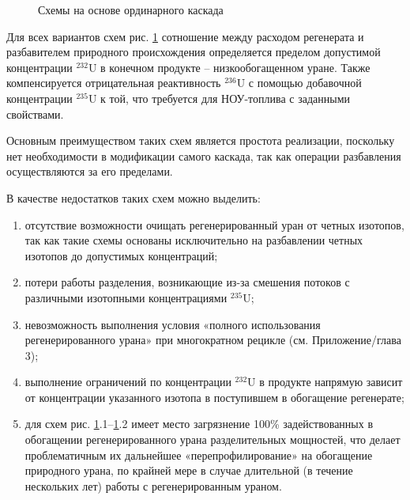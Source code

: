 \begin{figure}[ht]
  \caption{Схемы на основе ординарного каскада}\label{fig:diagram1}
\end{figure}

Для всех вариантов схем рис. \ref{fig:diagram1} сотношение между расходом регенерата и разбавителем природного происхождения определяется пределом допустимой концентрации $^{232}$U в конечном продукте -- низкообогащенном уране. Также компенсируется отрицательная реактивность $^{236}$U с помощью добавочной концентрации $^{235}$U к той, что требуется для НОУ-топлива с заданными свойствами.

Основным преимуществом таких схем является простота реализации, поскольку нет необходимости в модификации самого каскада, так как операции разбавления осуществляются за его пределами.

В качестве недостатков таких схем можно выделить:
\begin{enumerate}
  \item отсутствие возможности очищать регенерированный уран от четных изотопов, так как такие схемы основаны исключительно на разбавлении четных изотопов до допустимых концентраций;
  \item потери работы разделения, возникающие из-за смешения потоков с различными изотопными концентрациями $^{235}$U;
  \item невозможность выполнения условия «полного использования регенерированного урана» при многократном рецикле \cite{smirnovApplyingEnrichmentCapacities2018} (см. Приложение/глава 3);
  \item выполнение ограничений по концентрации $^{232}$U в продукте напрямую зависит от концентрации указанного изотопа в поступившем в обогащение регенерате;
  \item для схем рис. \ref{fig:diagram1}.1--\ref{fig:diagram1}.2 имеет место загрязнение 100\% задействованных в обогащении регенерированного урана разделительных мощностей, что делает проблематичным их дальнейшее «перепрофилирование» на обогащение природного урана, по крайней мере в случае длительной (в течение нескольких лет) работы с регенерированным ураном.
\end{enumerate}

